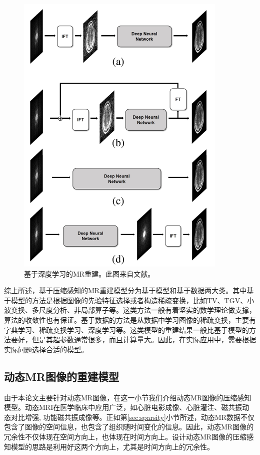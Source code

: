 \begin{figure}[htbp]
\centering
\includegraphics[width=0.9\textwidth]{img/intro/deepmri.png}
\caption{基于深度学习的MR重建。此图来自文献\cite{ye2019compressed}。}
\label{fig:deepmri}
\end{figure}

综上所述，基于压缩感知的MR重建模型分为基于模型和基于数据两大类。其中基于模型的方法是根据图像的先验特征选择或者构造稀疏变换，比如TV、TGV、小波变换、多尺度分析、非局部算子等。这类方法一般有着坚实的数学理论做支撑，算法的收敛性也有保证。基于数据的方法是从数据中学习图像的稀疏变换，主要有字典学习、稀疏变换学习、深度学习等。这类模型的重建结果一般比基于模型的方法要好，但是其超参数通常很多，而且计算量大。因此，在实际应用中，需要根据实际问题选择合适的模型。

\subsection{动态MR图像的重建模型}
\label{sec:dmri}
由于本论文主要针对动态MR图像，在这一小节我们介绍动态MR图像的压缩感知模型。动态MRI在医学临床中应用广泛，如心脏电影成像、心脏灌注、磁共振动态对比增强, 功能磁共振成像等。正如第\ref{sec:sparsity}小节所述，动态MR数据不仅包含了图像的空间信息，也包含了组织随时间变化的信息。因此，动态MR图像的冗余性不仅体现在空间方向上，也体现在时间方向上。设计动态MR图像的压缩感知模型的思路是利用好这两个方向上，尤其是时间方向上的冗余性。

